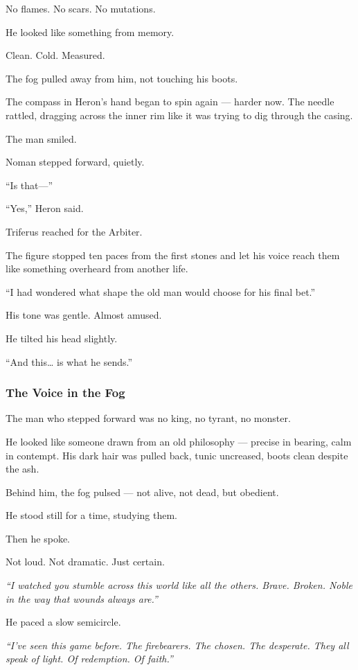 \documentclass[12pt]{article}
\begin{document}
No flames. No scars. No mutations.

He looked like something from memory.

Clean. Cold. Measured.

The fog pulled away from him, not touching his boots.

The compass in Heron’s hand began to spin again — harder now. The needle rattled, dragging across the inner rim like it was trying to dig through the casing.

The man smiled.

Noman stepped forward, quietly.

“Is that—”

“Yes,” Heron said.

Triferus reached for the Arbiter.

The figure stopped ten paces from the first stones and let his voice reach them like something overheard from another life.

“I had wondered what shape the old man would choose for his final bet.”

His tone was gentle. Almost amused.

He tilted his head slightly.

“And this… is what he sends.”

\dotfill

\subsubsection*{The Voice in the Fog}

The man who stepped forward was no king, no tyrant, no monster.

He looked like someone drawn from an old philosophy — precise in bearing, calm in contempt. His dark hair was pulled back, tunic uncreased, boots clean despite the ash.

Behind him, the fog pulsed — not alive, not dead, but obedient.

He stood still for a time, studying them.

Then he spoke.

Not loud. Not dramatic. Just certain.

\bigskip

\textit{“I watched you stumble across this world like all the others. Brave. Broken. Noble in the way that wounds always are.”}

He paced a slow semicircle.

\textit{“I’ve seen this game before. The firebearers. The chosen. The desperate. They all speak of light. Of redemption. Of faith.”}
\end{document}
